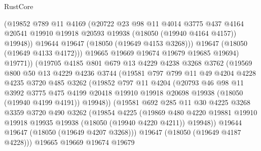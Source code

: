 \begin{lexlean}{RustCore}
\begin{coremodule}
                  (@19852
                    @789
                    @11
                    @4169
                    (@20722
                      @23
                      @98
                      @11
                      @4014
                      @3775
                      @437
                      @4164
                      @20541
                      @19910
                      @19918
                      @20593
                      @19938
                      (@18050 (@19940 @4164 @4157))
                      @19948))
                  @19644
                  @19647
                  (@18050 (@19649 @4153 @3268)))
                @19647
                (@18050 (@19649 @4133 @4172)))
              @19665
              @19669
              @19674
              @19679
              @19685
              @19694)
            @19771))
        (@19705
          @4185
          @801
          @679
          @13
          @4229
          @4238
          @3268
          @3762
          (@19569
            @800
            @50
            @13
            @4229
            @4236
            @3744
            (@19581
              @797
              @799
              @11
              @49
              @4204
              @4228
              @4235
              @3720
              @485
              @3262
              (@19852
                @797
                @11
                @4204
                (@20793
                  @46
                  @98
                  @11
                  @3992
                  @3775
                  @475
                  @4199
                  @20418
                  @19910
                  @19918
                  @20698
                  @19938
                  (@18050 (@19940 @4199 @4191))
                  @19948))
              (@19581
                @692
                @285
                @11
                @30
                @4225
                @3268
                @3359
                @3720
                @490
                @3262
                (@19854
                  @4225
                  (@19869
                    @480
                    @4220
                    @19881
                    @19910
                    @19918
                    @19935
                    @19938
                    (@18050 (@19940 @4220 @4211))
                    @19948))
                @19644
                @19647
                (@18050 (@19649 @4207 @3268)))
              @19647
              (@18050 (@19649 @4187 @4228)))
            @19665
            @19669
            @19674
            @19679

\end{coremodule}
\end{lexlean}
